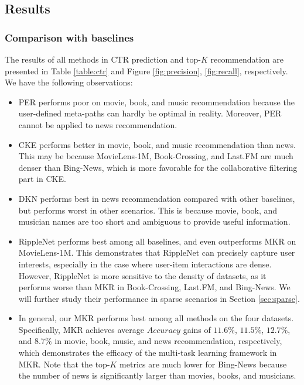 \documentclass[sigconf]{acmart}
\begin{document}
		
        
		
	\subsection{Results}
    	\subsubsection{Comparison with baselines}
    	\label{sec:observation}
        	The results of all methods in CTR prediction and top-$K$ recommendation are presented in Table \ref{table:ctr} and Figure \ref{fig:precision}, \ref{fig:recall}, respectively.
        	We have the following observations:
        	\begin{itemize}
        		\item
        			PER performs poor on movie, book, and music recommendation because the user-defined meta-paths can hardly be optimal in reality.
        			Moreover, PER cannot be applied to news recommendation.
        		\item
        			CKE performs better in movie, book, and music recommendation than news.
        			This may be because MovieLens-1M, Book-Crossing, and Last.FM are much denser than Bing-News, which is more favorable for the collaborative filtering part in CKE.
        		\item
        			DKN performs best in news recommendation compared with other baselines, but performs worst in other scenarios.
        			This is because movie, book, and musician names are too short and ambiguous to provide useful information.
        		\item
        			RippleNet performs best among all baselines, and even outperforms MKR on MovieLens-1M.
        			This demonstrates that RippleNet can precisely capture user interests, especially in the case where user-item interactions are dense.
        			However, RippleNet is more sensitive to the density of datasets, as it performs worse than MKR in Book-Crossing, Last.FM, and Bing-News.
        			We will further study their performance in sparse scenarios in Section \ref{sec:sparse}.
        		\item
        			In general, our MKR performs best among all methods on the four datasets.
        			Specifically, MKR achieves average $Accuracy$ gains of $11.6\%$, $11.5\%$, $12.7\%$, and $8.7\%$ in movie, book, music, and news recommendation, respectively, which demonstrates the efficacy of the multi-task learning framework in MKR.
        			Note that the top-$K$ metrics are much lower for Bing-News because the number of news is significantly larger than movies, books, and musicians.
        	\end{itemize}
        	
\end{document}
